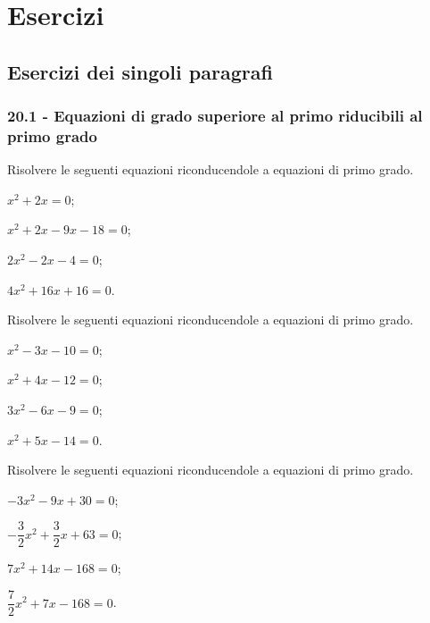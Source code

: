
\section{Esercizi}

\subsection{Esercizi dei singoli paragrafi}

\subsubsection*{20.1 - Equazioni di grado superiore al primo riducibili al primo grado}

\begin{esercizio}[\Ast]
\label{ese:20.1}
Risolvere le seguenti equazioni riconducendole a equazioni di primo grado.
\begin{multicols}{2}
\begin{enumeratea}
 \item $x^{2}+2x=0$;
 \item $x^{2}+2x-9x-18=0$;
 \item $2x^{2}-2x-4=0$;
 \item $4x^{2}+16x+16=0$.
\end{enumeratea}
\end{multicols}
\end{esercizio}

\begin{esercizio}[\Ast]
\label{ese:20.2}
Risolvere le seguenti equazioni riconducendole a equazioni di primo grado.
\begin{multicols}{2}
\begin{enumeratea}
 \item $x^{2}-3x-10=0$;
 \item $x^{2}+4x-12=0$;
 \item $3x^{2}-6x-9=0$;
 \item $x^{2}+5x-14=0$.
\end{enumeratea}
\end{multicols}
\end{esercizio}

\begin{esercizio}[\Ast]
\label{ese:20.3}
Risolvere le seguenti equazioni riconducendole a equazioni di primo grado.
\begin{multicols}{2}
\begin{enumeratea}
 \item $-3x^{2}-9x+30=0$;
 \item $-{\dfrac{3}{2}}x^{2}+\dfrac{3}{2}x+63=0$;
 \item $7x^{2}+14x-168=0$;
 \item $\dfrac{7}{2}x^{2}+7x-168=0$.
\end{enumeratea}
\end{multicols}
\end{esercizio}

